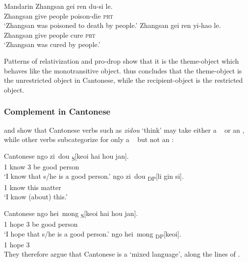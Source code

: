 \documentclass[output=paper,chinesefont,hidelinks]{langscibook}
\begin{document}
\ea%
    \label{ex:Sinitic:20}Mandarin
\ea    \gll Zhangsan  gei  ren  du-si    le.\\
         Zhangsan  give  people   poison-die  \textsc{prt}\\
    \glt`Zhangsan was poisoned to death by people.'
\ex    \gll *Zhangsan   gei  ren  yi-hao    le.\\
         Zhangsan  give  people   cure    \textsc{prt}\\
    \glt`Zhangsan was cured by people.' \citep[257]{Lefebvre2011}
    \z\z

  Patterns of relativization and pro-drop show that it is the theme-object which behaves like the monotransitive object. \citet{Lam2008} thus concludes that the theme-object is the unrestricted object in Cantonese, while the recipient-object is the restricted object.

\subsubsection{Complement in Cantonese}
\label{sec:Sinitic:3.1.2.3}

\citet{Lee2002} and \citet{BodomoLee2003} show that  Cantonese verbs such as \textit{zidou} `think' may take either a \COMP\  or an {\OBJ} , while other verbs subcategorize for only a \COMP\  but not an {\OBJ} :

\ea%
    \label{ex:Sinitic:21}Cantonese
    \ea\label{ex:Sinitic:21a}
    \gll ngo  zi~dou  \textsubscript{S}[keoi  hai  hou  jan].\\
         {1\SG}  know   {\db\db}{3\SG}  be  good  person\\
    \glt`I know that s/he is a good person.'
    \ex\label{ex:Sinitic:21b}
    \gll ngo  zi~dou  \textsubscript{DP}[li  gin  si].\\
         {1\SG}  know       {\db\db\db\db}this  {\CLF}  matter\\
    \glt`I know (about) this.'
    \z\z

\ea%
    \label{ex:Sinitic:22}Cantonese
    \ea\label{ex:Sinitic:22a}
    \gll ngo  hei~mong  \textsubscript{S}[keoi  hai  hou  jan].\\
         {1\SG}  hope       {\db\db}{3\SG}  be  good person\\
    \glt `I hope that s/he is a good person.'
    \ex\label{ex:Sinitic:22b}
    \gll *ngo  hei~mong  \textsubscript{DP}[keoi].\\
         {1\SG}  hope         {\db\db\db\db}{3\SG}\\
    \z\z
    They therefore argue that Cantonese is a `mixed language', along the lines of \citet{DL00}.
\end{document}
